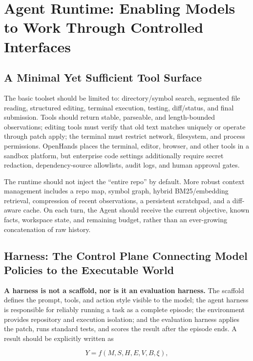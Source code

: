 \documentclass[10pt,a4paper,UTF8,fontset=none]{ctexart}
\begin{document}
\section{Agent Runtime: Enabling Models to Work Through Controlled Interfaces}

\subsection{A Minimal Yet Sufficient Tool Surface}

The basic toolset should be limited to: directory/symbol search, segmented file reading, structured editing, terminal execution, testing, diff/status, and final submission. Tools should return stable, parseable, and length-bounded observations; editing tools must verify that old text matches uniquely or operate through patch apply; the terminal must restrict network, filesystem, and process permissions. OpenHands places the terminal, editor, browser, and other tools in a sandbox platform\cite{wang2024openhands}, but enterprise code settings additionally require secret redaction, dependency-source allowlists, audit logs, and human approval gates.

The runtime should not inject the ``entire repo'' by default. More robust context management includes a repo map, symbol graph, hybrid BM25/embedding retrieval, compression of recent observations, a persistent scratchpad, and a diff-aware cache. On each turn, the Agent should receive the current objective, known facts, workspace state, and remaining budget, rather than an ever-growing concatenation of raw history.

\subsection{Harness: The Control Plane Connecting Model Policies to the Executable World}

\textbf{A harness is not a scaffold, nor is it an evaluation harness.} The scaffold defines the prompt, tools, and action style visible to the model; the agent harness is responsible for reliably running a task as a complete episode; the environment provides repository and execution isolation; and the evaluation harness applies the patch, runs standard tests, and scores the result after the episode ends. A result should be explicitly written as

\begin{equation}
Y=f(M,S,H,E,V,B,\xi),
\label{eq:harness-factorization}
\end{equation}
\end{document}
